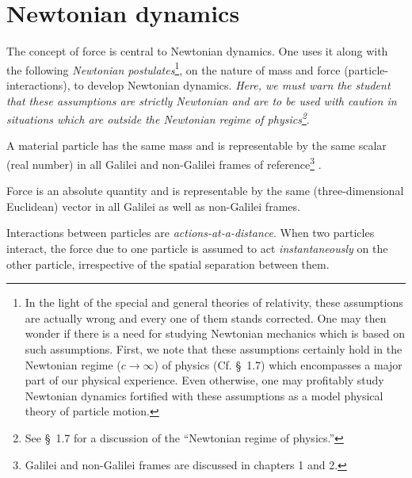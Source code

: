 \vspace{-.3cm}
\section{Newtonian dynamics}

The concept of force is central to Newtonian dynamics. 
One
uses it along with the following \textsl{Newtonian 
postulates}\footnote{In the light of the 
special and general theories of relativity, these 
assumptions are actually wrong and every one of them 
stands 
corrected. One may then wonder if there is a need for 
studying Newtonian mechanics which is based on such 
assumptions. First, we note that these assumptions 
certainly hold in the Newtonian regime ($c\rightarrow 
\infty$) of physics (Cf. \S~1.7) which encompasses a 
major 
part of our physical experience. Even otherwise, one 
may 
profitably study Newtonian dynamics fortified with 
these 
assumptions as a model physical theory of particle 
motion.}, 
on the nature of mass and force 
(particle-interactions), 
to develop Newtonian dynamics. 
\textsl{Here, we must warn the student that these 
assumptions are strictly Newtonian and are to be used 
with 
caution in situations which are outside the Newtonian 
regime 
of physics\footnote{See \S~1.7 for a discussion of the 
``Newtonian regime of physics.''}}.

 A material particle has 
the 
same mass and is representable by the same scalar 
(real 
number) in all Galilei and non-Galilei frames of 
reference\footnote{Galilei and non-Galilei frames are 
discussed in chapters 1 and 2.} . 

 Force is an absolute 
quantity 
and is representable by the same (three-dimensional 
Euclidean) vector in all Galilei as well as 
non-Galilei 
frames.

Interactions between particles are 
\textsl{actions-at-a-distance}. When two particles 
interact, 
the force due to one particle is assumed to act 
\textsl{instantaneously} on the other particle, 
irrespective 
of the spatial separation between them.

\vspace{-.3cm}
